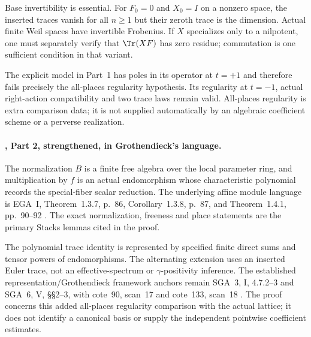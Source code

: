 Base invertibility is essential.
For $F_0=0$ and $X_0=I$ on a nonzero space,
the inserted traces vanish for all $n\ge1$ but their
zeroth trace is the dimension.
Actual finite Weil spaces have invertible Frobenius.
If $X$ specializes only to a nilpotent, one must
separately verify that $\Tr(XF)$ has zero residue;
commutation is one sufficient condition in that variant.

The explicit model in Part~1 has poles in its operator
at $t=+1$ and therefore fails precisely the all-places
regularity hypothesis.
Its regularity at $t=-1$, actual right-action
compatibility and two trace laws remain valid.
All-places regularity is extra comparison data;
it is not supplied automatically by an algebraic
coefficient scheme or a perverse realization.

\paragraph{, Part 2, strengthened, in Grothendieck's language.}
The normalization $B$ is a finite free algebra over
the local parameter ring, and multiplication by $f$
is an actual endomorphism whose characteristic
polynomial records the special-fiber scalar reduction.
The underlying affine module language is EGA~I,
Theorem~1.3.7, p.~86, Corollary~1.3.8, p.~87,
and Theorem~1.4.1, pp.~90--92 \cite{EGA}.
The exact normalization, freeness and place statements
are the primary Stacks lemmas cited in the proof.

The polynomial trace identity is represented by
specified finite direct sums and tensor powers
of endomorphisms. The alternating extension uses
an inserted Euler trace, not an effective-spectrum
or $\gamma$-positivity inference.
The established representation/Grothendieck framework
anchors remain SGA~3, I, 4.7.2--3 and
SGA~6, V, \S\S2--3, with cote~90, scan~17 and
cote~133, scan~18 \cite{SGA3,SGA6,Archive}.
The proof concerns this added all-places regularity
comparison with the actual lattice; it does not
identify a canonical basis or supply the independent
pointwise coefficient estimates.

